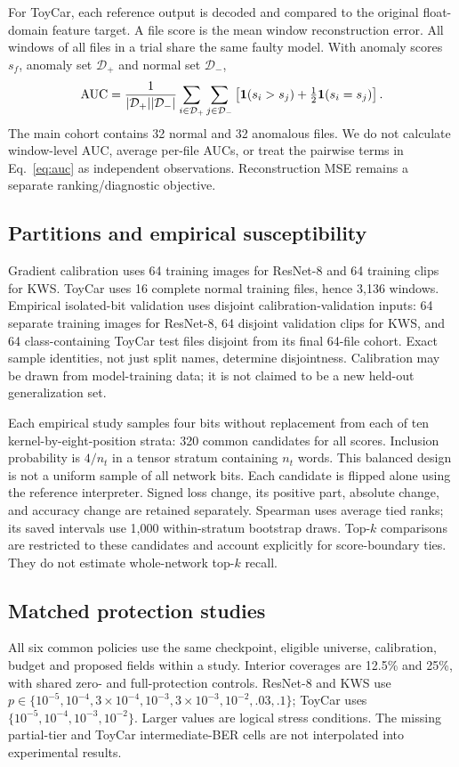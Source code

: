 For ToyCar, each reference output is decoded and compared to the original
float-domain feature target. A file score is the mean window reconstruction error.
All windows of all files in a trial share the same faulty model. With anomaly
scores $s_f$, anomaly set $\mathcal D_+$ and normal set $\mathcal D_-$,
\begin{equation}
\operatorname{AUC}=\frac{1}{|\mathcal D_+||\mathcal D_-|}
\sum_{i\in\mathcal D_+}\sum_{j\in\mathcal D_-}
\left[\mathbf{1}(s_i>s_j)+\tfrac12\mathbf{1}(s_i=s_j)\right].
\label{eq:auc}
\end{equation}
The main cohort contains 32 normal and 32 anomalous files. We do not calculate
window-level AUC, average per-file AUCs, or treat the pairwise terms in
Eq.~\eqref{eq:auc} as independent observations. Reconstruction MSE remains a
separate ranking/diagnostic objective.

\subsection{Partitions and empirical susceptibility}
Gradient calibration uses 64 training images for ResNet-8 and 64 training clips
for KWS. ToyCar uses 16 complete normal training files, hence 3,136 windows.
Empirical isolated-bit validation uses disjoint calibration-validation inputs:
64 separate training images for ResNet-8, 64 disjoint validation clips for
KWS, and 64 class-containing ToyCar test files disjoint from its final 64-file
cohort. Exact sample identities, not just split names, determine disjointness.
Calibration may be drawn from model-training data; it is not claimed to be a
new held-out generalization set.

Each empirical study samples four bits without replacement from each of ten
kernel-by-eight-position strata: 320 common candidates for all scores. Inclusion
probability is $4/n_t$ in a tensor stratum containing $n_t$ words. This balanced
design is not a uniform sample of all network bits. Each candidate is flipped
alone using the reference interpreter. Signed loss change, its positive part,
absolute change, and accuracy change are retained separately. Spearman uses
average tied ranks; its saved intervals use 1,000 within-stratum bootstrap draws.
Top-$k$ comparisons are restricted to these candidates and account explicitly for
score-boundary ties. They do not estimate whole-network top-$k$ recall.

\subsection{Matched protection studies}
All six common policies use the same checkpoint, eligible universe, calibration,
budget and proposed fields within a study. Interior coverages are 12.5\% and
25\%, with shared zero- and full-protection controls. ResNet-8 and KWS use
$p\in\{10^{-5},10^{-4},3\!\times\!10^{-4},10^{-3},3\!\times\!10^{-3},10^{-2},.03,.1\}$;
ToyCar uses $\{10^{-5},10^{-4},10^{-3},10^{-2}\}$. Larger values are logical stress
conditions. The missing partial-tier and ToyCar intermediate-BER cells are not
interpolated into experimental results.


